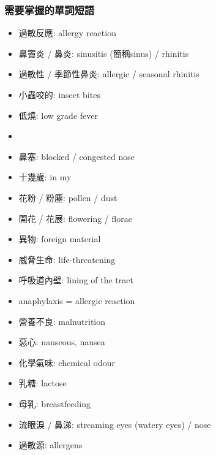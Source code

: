 \subsubsection*{需要掌握的單詞短語}
\begin{multicols}{2}
\begin{itemize}
  \itemsep0em
  \item 過敏反應: allergy reaction
  \item 鼻竇炎 / 鼻炎: sinusitis (簡稱sinus) / rhinitis
  \item 過敏性 / 季節性鼻炎: allergic / seasonal rhinitis
  \item 小蟲咬的: insect bites
  \item 低燒: low grade fever
  \item {}
  \item 鼻塞: blocked / congested nose
  \item 十幾歲: in my 
  \item 花粉 / 粉塵: pollen / dust
  \item 開花 / 花展: flowering / florae
  \item 異物: foreign material
  \item 威脅生命: life-threatening
  \item 呼吸道內壁: lining of the tract
  \item anaphylaxis = allergic reaction
  \item 營養不良: malnutrition
  \item 惡心: nauseous, nausea
  \item 化學氣味: chemical odour
  \item 乳糖: lactose
  \item 母乳: breastfeeding
  \item 流眼淚 / 鼻涕: streaming eyes (watery eyes) / nose
  \item 過敏源: allergens
\end{itemize}
\end{multicols}

